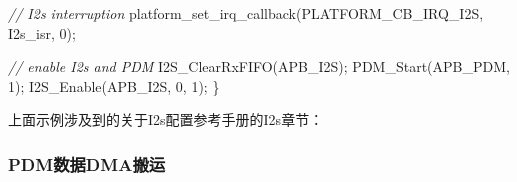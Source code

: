 \documentclass[
  12pt,
]{book}
\newenvironment{Shaded}{\begin{snugshade}}{\end{snugshade}}
\newcommand{\CommentTok}[1]{\textcolor[rgb]{0.56,0.35,0.01}{\textit{#1}}}
\newcommand{\DecValTok}[1]{\textcolor[rgb]{0.00,0.00,0.81}{#1}}
\newcommand{\NormalTok}[1]{#1}
\begin{document}
\begin{Shaded}
\begin{Highlighting}[]
    \CommentTok{// I2s interruption}
\NormalTok{    platform_set_irq_callback(PLATFORM_CB_IRQ_I2S, I2s_isr, }\DecValTok{0}\NormalTok{);}

    \CommentTok{// enable I2s and PDM}
\NormalTok{    I2S_ClearRxFIFO(APB_I2S);}
\NormalTok{    PDM_Start(APB_PDM, }\DecValTok{1}\NormalTok{);}
\NormalTok{    I2S_Enable(APB_I2S, }\DecValTok{0}\NormalTok{, }\DecValTok{1}\NormalTok{);}
\NormalTok{\}}
\end{Highlighting}
\end{Shaded}

上面示例涉及到的关于I2s配置参考手册的I2s章节：

\hypertarget{pdmux6570ux636edmaux642cux8fd0}{%
\subsubsection{PDM数据DMA搬运}\label{pdmux6570ux636edmaux642cux8fd0}}
\end{document}
